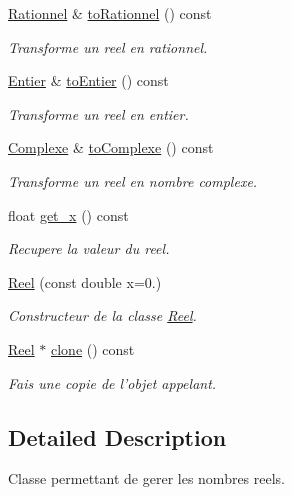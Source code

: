 \begin{DoxyCompactItemize}
\hyperlink{class_l_o21_1_1_rationnel}{\-Rationnel} \& \hyperlink{class_l_o21_1_1_reel_ada7096a46903e140082b945904018ca7}{to\-Rationnel} () const 
\begin{DoxyCompactList}\small\item\em \-Transforme un reel en rationnel. \end{DoxyCompactList}\item 
\hyperlink{class_l_o21_1_1_entier}{\-Entier} \& \hyperlink{class_l_o21_1_1_reel_aac90e89b0b11d89898fc5e6faf8ad2e4}{to\-Entier} () const 
\begin{DoxyCompactList}\small\item\em \-Transforme un reel en entier. \end{DoxyCompactList}\item 
\hyperlink{class_l_o21_1_1_complexe}{\-Complexe} \& \hyperlink{class_l_o21_1_1_reel_a9b50412d065606b01f322f94e5dd0639}{to\-Complexe} () const 
\begin{DoxyCompactList}\small\item\em \-Transforme un reel en nombre complexe. \end{DoxyCompactList}\item 
float \hyperlink{class_l_o21_1_1_reel_a2a989b2cac3a15ae99d22f39111f19c6}{get\-\_\-x} () const 
\begin{DoxyCompactList}\small\item\em \-Recupere la valeur du reel. \end{DoxyCompactList}\item 
\hyperlink{class_l_o21_1_1_reel_adf2ed2cbdebab95f05e2744c981d17f3}{\-Reel} (const double x=0.)
\begin{DoxyCompactList}\small\item\em \-Constructeur de la classe \hyperlink{class_l_o21_1_1_reel}{\-Reel}. \end{DoxyCompactList}\item 
\hyperlink{class_l_o21_1_1_reel}{\-Reel} $\ast$ \hyperlink{class_l_o21_1_1_reel_a03bf8d59ba75b2fc45d3db330210201a}{clone} () const 
\begin{DoxyCompactList}\small\item\em \-Fais une copie de l'objet appelant. \end{DoxyCompactList}\end{DoxyCompactItemize}


\subsection{\-Detailed \-Description}
\-Classe permettant de gerer les nombres reels. 

